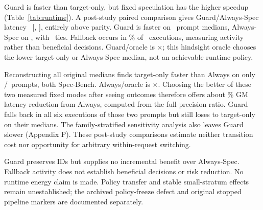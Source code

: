 
Guard is faster than target-only, but fixed speculation has the higher speedup (Table~\ref{tab:runtime}). A post-study paired comparison gives Guard/Always-Spec latency \RTSecondary\ [\RTSecondaryLo, \RTSecondaryHi], entirely above parity. Guard is faster on \RTGuardFaster\ prompt medians, Always-Spec on \RTAlwaysFaster, with \RTTies\ ties. Fallback occurs in \RTFallback\% of \RTExact\ executions, measuring activity rather than beneficial decisions. Guard/oracle is \RTOracle$\times$; this hindsight oracle chooses the lower target-only or Always-Spec median, not an achievable runtime policy.

Reconstructing all original medians finds target-only faster than Always on only \DerTargetFaster/\RTPrompts\ prompts, both Spec-Bench. Always/oracle is \DerAlwaysOracle$\times$. Choosing the better of these two measured fixed modes after seeing outcomes therefore offers about \DiagMOpportunity\% GM latency reduction from Always, computed from the full-precision ratio. Guard falls back in all six executions of those two prompts but still loses to target-only on their medians. The family-stratified sensitivity analysis also leaves Guard slower (Appendix P). These post-study comparisons estimate neither transition cost nor opportunity for arbitrary within-request switching.

Guard preserves IDs but supplies no incremental benefit over Always-Spec. Fallback activity does not establish beneficial decisions or risk reduction. No runtime energy claim is made. Policy transfer and stable small-stratum effects remain unestablished; the archived policy-freeze defect and original stopped pipeline markers are documented separately.
